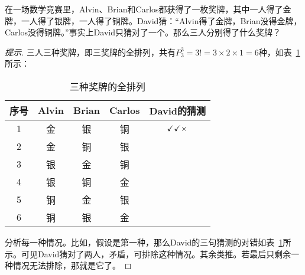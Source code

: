\begin{example}
  在一场数学竞赛里，Alvin、Brian和Carlos都获得了一枚奖牌，其中一人得了金牌，一人得了银牌，一人得了铜牌。David猜：“Alvin得了金牌，Brian没得金牌，Carlos没得铜牌。”事实上David只猜对了一个。那么三人分别得了什么奖牌？
\end{example}
\begin{proof}[提示]
  三人三种奖牌，即三奖牌的全排列，共有$P_3^3=3!=3\times2\times1=6$种，如表~\ref{tab:permutation-of-medals}所示：
  \begin{table}[htbp]
    \centering
    \begin{tabular}{ccccc}
      \toprule
      序号 & Alvin & Brian & Carlos & David的猜测\\\midrule
      1    & 金    & 银    & 铜     & $\checkmark\checkmark\times$\\
      2    & 金    & 铜    & 银     &\\
      3    & 银    & 金    & 铜     &\\
      4    & 银    & 铜    & 金     &\\
      5    & 铜    & 金    & 银     &\\
      6    & 铜    & 银    & 金     &\\\bottomrule
    \end{tabular}
    \caption{三种奖牌的全排列}
    \label{tab:permutation-of-medals}
  \end{table}

  分析每一种情况。比如，假设是第一种，那么David的三句猜测的对错如表~\ref{tab:permutation-of-medals}所示。可见David猜对了两人，矛盾，可排除这种情况。其余类推。若最后只剩余一种情况无法排除，那就是它了。
\end{proof}


